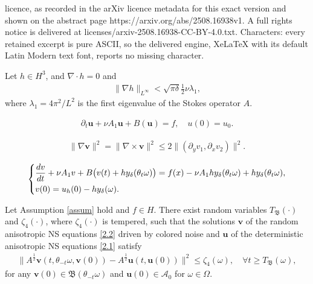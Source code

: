 \documentclass[10pt,a4paper]{amsart}
\renewcommand{\d}{{\rm{d}}}
\begin{document}
licence, as recorded in the arXiv licence metadata for this exact version and shown on the abstract page https://arxiv.org/abs/2508.16938v1. A full rights notice is delivered at licenses/arxiv-2508.16938-CC-BY-4.0.txt. Characters: every retained excerpt is pure ASCII, so the delivered engine, XeLaTeX with its default Latin Modern text font, reports no missing character.
\begin{assumption} \label{assum}
Let    $ h \in H^3$, and $\nabla\cdot h=0$ and
 \begin{align*}
  \|\nabla h\|_{L^\infty} <  \sqrt {\pi\delta} \frac{1}{2}\nu \lambda_1 ,
 \end{align*}
where  $\lambda_1 = 4\pi^2 /L^2$ is the first eigenvalue of the Stokes operator $A$.
  \end{assumption}

 \begin{align}\label{2.1}
   \partial_t\textbf{u}+ \nu A_1\textbf{u}+B(\textbf{u})  =f,\quad u(0)=u_{0}.
\end{align}

\begin{align}\label{3.9}
\|\nabla \textbf{v}\|^2=\|\nabla\times \textbf{v}\|^2\leq 2\|(\partial_yv_1,\partial_xv_2)\|^2.
\end{align}

\begin{align}\label{2.2}
\left\{
\begin{aligned}
&
\frac{\d \textbf{v}}{\d t}+ \nu A_1\textbf{v}+B\big( \textbf{v}(t)+hy_\delta(\theta_t\omega)\big)=f(\textbf{x})-  \nu A_1hy_\delta(\theta_t\omega)+hy_\delta (\theta_t\omega), \\
& \textbf{v}(0)=\textbf{u}_h(0)-hy_\delta (\omega).
\end{aligned}
\right.
\end{align}

\begin{lemma}[$H^1$-distance]
\label{lemma4.3}
 Let Assumption \ref{assum} hold and $f\in H$. There   exist   random variables $T_{\mathfrak B}(\cdot)$ and    $\zeta_4(\cdot)$, where  $\zeta_4(\cdot)$ is tempered,  such that the solutions $\textbf{v}$  of the random  anisotropic NS equations \eqref{2.2} driven by colored noise and $\textbf{u}$  of the deterministic anisotropic NS equations  \eqref{2.1} satisfy
\begin{align}
 \big \|A^{\frac 12} \textbf{v}(t,\theta_{-t}\omega,\textbf{v}(0))-A^{\frac 12} \textbf{u}(t,\textbf{u}(0)) \big\| ^2 \leq \zeta_4(\omega),\quad \forall t\geq T_{\mathfrak B}(\omega), \nonumber
\end{align}
for any $\textbf{v}(0)\in\mathfrak{B}(\theta_{-t}\omega)$
 and $\textbf{u}(0)\in\mathcal{A}_0$ for $\omega\in \Omega$.
\end{lemma}
\end{document}

